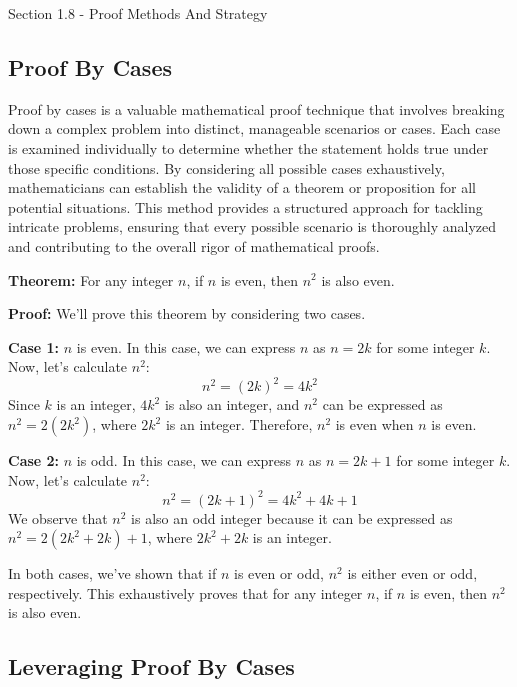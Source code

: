 \begin{notes}{Section 1.8 - Proof Methods And Strategy}
    \subsection*{Proof By Cases}

    Proof by cases is a valuable mathematical proof technique that involves breaking down a complex problem into distinct, manageable scenarios or cases. Each case is examined individually to determine 
    whether the statement holds true under those specific conditions. By considering all possible cases exhaustively, mathematicians can establish the validity of a theorem or proposition for all potential 
    situations. This method provides a structured approach for tackling intricate problems, ensuring that every possible scenario is thoroughly analyzed and contributing to the overall rigor of mathematical 
    proofs.

    \begin{Highlight}
        \textbf{Theorem:} For any integer \(n\), if \(n\) is even, then \(n^2\) is also even.
    
    
        \textbf{Proof:} We'll prove this theorem by considering two cases. \vspace*{1em}
    
        \textbf{Case 1:} \(n\) is even. In this case, we can express \(n\) as \(n = 2k\) for some integer \(k\). Now, let's calculate \(n^2\):
        \[n^2 = (2k)^2 = 4k^2\]
        Since \(k\) is an integer, \(4k^2\) is also an integer, and \(n^2\) can be expressed as \(n^2 = 2(2k^2)\), where \(2k^2\) is an integer. Therefore, \(n^2\) is even when \(n\) is even.
    
        \textbf{Case 2:} \(n\) is odd. In this case, we can express \(n\) as \(n = 2k + 1\) for some integer \(k\). Now, let's calculate \(n^2\):
        \[n^2 = (2k + 1)^2 = 4k^2 + 4k + 1\]
        We observe that \(n^2\) is also an odd integer because it can be expressed as \(n^2 = 2(2k^2 + 2k) + 1\), where \(2k^2 + 2k\) is an integer.
    
    
        In both cases, we've shown that if \(n\) is even or odd, \(n^2\) is either even or odd, respectively. This exhaustively proves that for any integer \(n\), if \(n\) is even, then \(n^2\) is also even.
    \end{Highlight}

    \subsection*{Leveraging Proof By Cases}


\end{notes}
